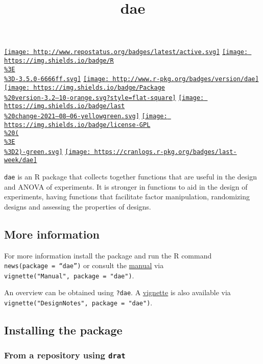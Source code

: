 \documentclass[
]{article}
\title{dae}
\author{}
\date{\vspace{-2.5em}}
\begin{document}
\maketitle

\href{http://www.repostatus.org/\#active}{\texttt{[image: http://www.repostatus.org/badges/latest/active.svg]}}
\href{https://cran.r-project.org/}{\texttt{[image: https://img.shields.io/badge/R\\\%3E\\\%3D-3.5.0-6666ff.svg]}}
\href{https://cran.r-project.org/package=dae}{\texttt{[image: http://www.r-pkg.org/badges/version/dae]}}
\href{/commits/master}{\texttt{[image: https://img.shields.io/badge/Package\\\%20version-3.2--10-orange.svg?style=flat-square]}}
\href{/commits/master}{\texttt{[image: https://img.shields.io/badge/last\\\%20change-2021--08--06-yellowgreen.svg]}}
\href{http://choosealicense.com/licenses/gpl-2.0/}{\texttt{[image: https://img.shields.io/badge/license-GPL\\\%20(\\\%3E\\\%3D2)-green.svg]}}
\href{commits/master}{\texttt{[image: https://cranlogs.r-pkg.org/badges/last-week/dae]}}

\texttt{dae} is an R package that collects together functions that are
useful in the design and ANOVA of experiments. It is stronger in
functions to aid in the design of experiments, having functions that
facilitate factor manipulation, randomizing designs and assessing the
properties of designs.

\hypertarget{more-information}{%
\subsection{More information}\label{more-information}}

For more information install the package and run the R command
\texttt{news(package\ =\ “dae”)} or consult the
\href{./vignettes/dae-manual.pdf}{manual} via
\texttt{vignette("Manual",\ package\ =\ "dae")}.

An overview can be obtained using \texttt{?dae}. A
\href{./vignettes/DesignNotes.pdf}{vignette} is also available via
\texttt{vignette("DesignNotes",\ package\ =\ "dae")}.

\hypertarget{installing-the-package}{%
\subsection{Installing the package}\label{installing-the-package}}

\hypertarget{from-a-repository-using-drat}{%
\subsubsection{\texorpdfstring{From a repository using
\texttt{drat}}{From a repository using drat}}\label{from-a-repository-using-drat}}
\end{document}
